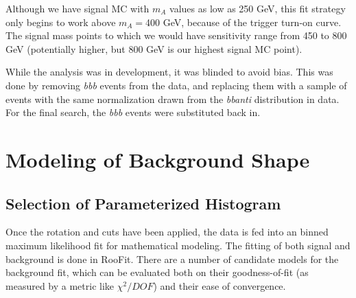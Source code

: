 Although we have signal MC with $m_A$ values as low as 250 GeV, this fit strategy only
begins to work above $m_A=$400 GeV, because of the trigger turn-on curve.  The signal mass 
points to which we would have sensitivity range from 450 to 800 GeV (potentially higher,
but 800 GeV is our highest signal MC point). 

While the analysis was in development, it was blinded to avoid bias.  This was done 
by removing \textit{bbb} events from the data, and replacing them with a sample of
events with the same normalization drawn from the \textit{bbanti} distribution
in data.  For the final search, the \textit{bbb} events were substituted back in.








\section{Modeling of Background Shape}
\subsection{Selection of Parameterized Histogram}
Once the rotation and cuts have been applied, the data is fed into an 
binned maximum likelihood fit for mathematical modeling.  The fitting
of both signal and background is done in RooFit.  There are a number 
of candidate models for the background fit, which can be evaluated
both on their goodness-of-fit (as measured by a metric like $\chi^2/DOF$)
and their ease of convergence.

